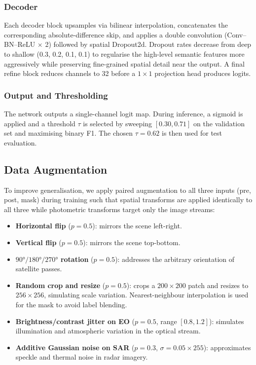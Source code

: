 \documentclass[12pt,a4paper]{article}
\begin{document}
\subsubsection{Decoder}

Each decoder block upsamples via bilinear interpolation, concatenates the corresponding
absolute-difference skip, and applies a double convolution (Conv--BN--ReLU $\times$ 2)
followed by spatial Dropout2d.  Dropout rates decrease from deep to shallow (0.3, 0.2,
0.1, 0.1) to regularise the high-level semantic features more aggressively while
preserving fine-grained spatial detail near the output.  A final refine block reduces
channels to 32 before a $1\times1$ projection head produces logits.

\subsubsection{Output and Thresholding}

The network outputs a single-channel logit map.  During inference, a sigmoid is applied
and a threshold $\tau$ is selected by sweeping $[0.30, 0.71]$ on the validation set and
maximising binary F1.  The chosen $\tau = 0.62$ is then used for test evaluation.

\subsection{Data Augmentation}

To improve generalisation, we apply paired augmentation to all three inputs (pre, post,
mask) during training such that spatial transforms are applied identically to all three
while photometric transforms target only the image streams:

\begin{itemize}[leftmargin=*]
  \item \textbf{Horizontal flip} ($p=0.5$): mirrors the scene left-right.
  \item \textbf{Vertical flip} ($p=0.5$): mirrors the scene top-bottom.
  \item \textbf{$90°/180°/270°$ rotation} ($p=0.5$): addresses the arbitrary orientation
    of satellite passes.
  \item \textbf{Random crop and resize} ($p=0.5$): crops a $200\times200$ patch and
    resizes to $256\times256$, simulating scale variation.  Nearest-neighbour
    interpolation is used for the mask to avoid label blending.
  \item \textbf{Brightness/contrast jitter on EO} ($p=0.5$, range $[0.8,1.2]$):
    simulates illumination and atmospheric variation in the optical stream.
  \item \textbf{Additive Gaussian noise on SAR} ($p=0.3$, $\sigma=0.05\times255$):
    approximates speckle and thermal noise in radar imagery.
\end{itemize}
\end{document}
